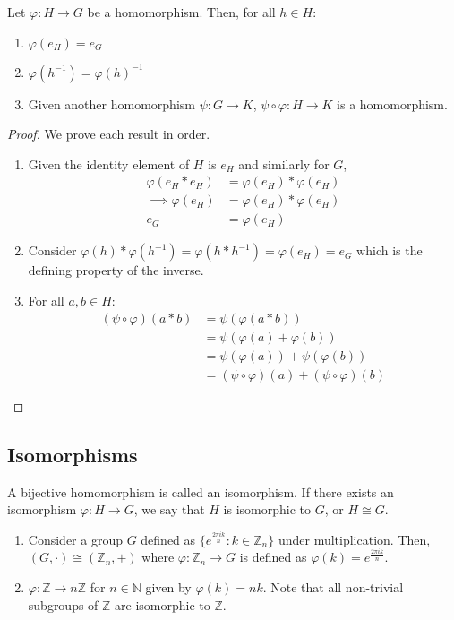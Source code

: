 \begin{proposition}
	Let \(\varphi: H \to G\) be a homomorphism.
	Then, for all \(h \in H\):
	\begin{enumerate}
		\item \(\varphi(e_H) = e_G\)
		\item \(\varphi(h^{-1}) = \varphi(h)^{-1}\)
		\item Given another homomorphism \(\psi: G \to K\), \(\psi \circ \varphi: H \to K\) is a homomorphism.
	\end{enumerate}
\end{proposition}
\begin{proof}
	We prove each result in order.
	\begin{enumerate}
		\item Given the identity element of \(H\) is \(e_H\) and similarly for \(G\),
		      \begin{align*}
			      \varphi(e_H \ast e_H) & = \varphi(e_H) \ast \varphi(e_H) \\
			      \implies \varphi(e_H) & = \varphi(e_H) \ast \varphi(e_H) \\
			      e_G                   & = \varphi(e_H)
		      \end{align*}
		\item Consider \(\varphi(h) \ast \varphi(h^{-1}) = \varphi(h \ast h^{-1}) = \varphi(e_H) = e_G\) which is the defining property of the inverse.
		\item For all \(a, b \in H\):
		      \begin{align*}
			      (\psi \circ \varphi) (a \ast b) & = \psi(\varphi(a \ast b))                           \\
			                                      & = \psi(\varphi(a) + \varphi(b))                     \\
			                                      & = \psi(\varphi(a)) + \psi(\varphi(b))               \\
			                                      & = (\psi \circ \varphi)(a) + (\psi \circ \varphi)(b)
		      \end{align*}
	\end{enumerate}
\end{proof}

\subsection{Isomorphisms}
A bijective homomorphism is called an isomorphism.
If there exists an isomorphism \(\varphi: H \to G\), we say that \(H\) is isomorphic to \(G\), or \(H \cong G\).
\begin{enumerate}
	\item Consider a group \(G\) defined as \(\{ e^{\frac{2 \pi i k}{n}} : k \in \mathbb Z_n \}\) under multiplication.
	      Then, \((G, \cdot) \cong (\mathbb Z_n, +)\) where \(\varphi: \mathbb Z_n \to G\) is defined as \(\varphi(k) = e^{\frac{2\pi i k}{n}}\).
	\item \(\varphi: \mathbb Z \to n\mathbb Z\) for \(n \in \mathbb N\) given by \(\varphi(k) = nk\).
	      Note that all non-trivial subgroups of \(\mathbb Z\) are isomorphic to \(\mathbb Z\).
\end{enumerate}

